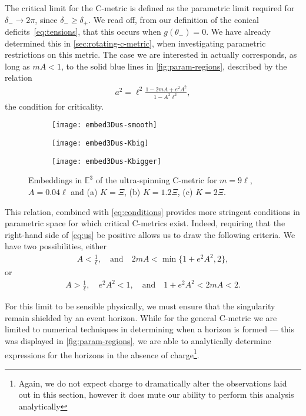 \documentclass[
twoside,
openright,
frontopenright,
]{dmathesis}
\begin{document}
The critical limit for the C-metric is defined as the parametric limit required
for $\delta_- \to 2\pi$, since $\delta_-\geqslant \delta_+$. We read off, from
our definition of the conical deficits~\eqref{eq:tensions}, that this occurs
when $g(\theta_-)=0$. We have already determined this in
\cref{sec:rotating-c-metric}, when investigating parametric restrictions on this
metric. The case we are interested in actually corresponds, as long as $mA < 1$,
to the solid blue lines in \cref{fig:param-regions}, described by the relation
\begin{align}\label{eq:us}
a^2 = \ell^2 \frac{1-2mA+e^2A^2}{1-A^2\ell^2},
\end{align}
the condition for criticality.


\begin{figure}
\centering
\begin{subfigure}[b]{0.2\textwidth}
\texttt{[image: embed3Dus-smooth]}
\caption{\label{fig:embed3Dus-smooth}}
\end{subfigure}\qquad
\begin{subfigure}[b]{0.2\textwidth}
\texttt{[image: embed3Dus-Kbig]}
\caption{\label{fig:embed3Dus-Kbig}}
\end{subfigure}\qquad
\begin{subfigure}[b]{0.2\textwidth}
\texttt{[image: embed3Dus-Kbigger]}
\caption{\label{fig:embed3Dus-Kbigger}}
\end{subfigure}
\caption{\label{fig:embed3Dus}Embeddings in $\mathbb{E}^3$ of the ultra-spinning
  C-metric for $m=9\ell$, $A=0.04\ell$ and (a) $K=\Xi$, (b) $K=1.2\Xi$, (c)
  $K=2\Xi$.} 
\end{figure}

This relation, combined with \cref{eq:conditions} provides more stringent
conditions in parametric space for which critical C-metrics exist. Indeed,
requiring that the right-hand side of \cref{eq:us} be positive allows us to draw
the following criteria. We have two possibilities, either
\begin{align}\label{eq:case1}
A<\frac{1}{\ell},\quad \mbox{and}\quad 2mA<\min \{1+e^2A^2,2\},
\end{align}
or
\begin{align}\label{eq:case2}
A>\frac{1}{\ell}, \quad e^2A^2<1, \quad \mbox{and} \quad 1+e^2A^2<2mA<2.
\end{align}

For this limit to be sensible physically, we must ensure that the singularity
remain shielded by an event horizon. While for the general C-metric we are
limited to numerical techniques in determining when a horizon is formed --- this
was displayed in \cref{fig:param-regions}, we are able to analytically
determine expressions for the horizons in the absence of charge\footnote{Again,
  we do not expect charge to dramatically alter the observations laid out in
  this section, however it does mute our ability to perform this analysis
  analytically}.
\end{document}
